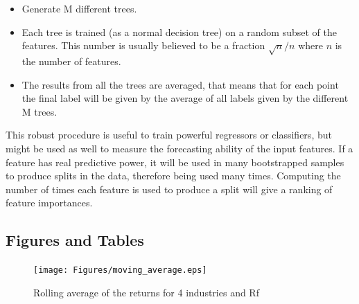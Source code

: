 \documentclass[a4paper]{article}
\numberwithin{equation}{subsection}
\begin{document}
\begin{itemize}
	\item Generate M different trees.
	\item Each tree is trained (as a normal decision tree) on a random subset of the features. This number is usually believed to be a fraction $\sqrt{n}/n$ where $n$ is the number of features.
	\item The results from all the trees are averaged, that means that for each point the final label will be given by the average of all labels given by the different M trees. 
\end{itemize}

This robust procedure is useful to train powerful regressors or classifiers, but might be used as well to measure the forecasting ability of the input features. If a feature has real predictive power, it will be used in many bootstrapped samples to produce splits in the data, therefore being used many times. Computing the number of times each feature is used to produce a split will give a ranking of feature importances.\\

\newpage
\subsection*{Figures and Tables}

\begin{figure}[htbp]
	\centering
	\texttt{[image: Figures/moving\_average.eps]}
	\caption{Rolling average of the returns for 4 industries and Rf}
	\label{rolling_average}
\end{figure}








\clearpage

\begin {table}[htbp]
\begin{center}

\end{center}
\caption {Descriptive statistics for simple returns} \label{industry_summary} 
\end {table}



\newpage

 

\end{document}
